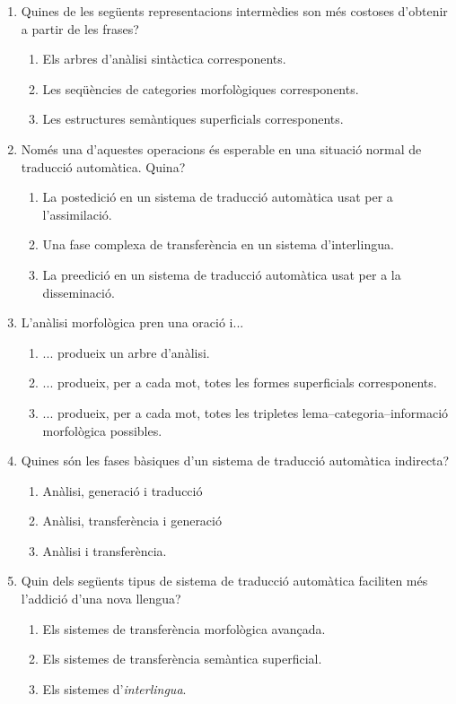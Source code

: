 \begin{enumerate}
\item Quines de les següents representacions intermèdies son més
  costoses d'obtenir a partir de les frases?
  \begin{enumerate}
  \item Els arbres d'anàlisi sintàctica corresponents.
  \item Les seqüències de categories morfològiques corresponents.
  \item Les estructures semàntiques superficials corresponents.
  \end{enumerate}

\item Només una d'aquestes operacions és esperable en una situació
  normal de traducció automàtica. Quina?
  \begin{enumerate}
  \item La postedició en un sistema de traducció automàtica usat per a
    l'assimilació.
  \item Una fase complexa de transferència en un sistema
    d'interlingua.
  \item La preedició en un sistema de traducció automàtica usat per a
    la disseminació.
  \end{enumerate}
      
\item L'anàlisi morfològica pren una oració i...
  \begin{enumerate}
  \item ... produeix un arbre d'anàlisi.
  \item ... produeix, per a cada mot, totes les formes superficials
    corresponents.
  \item ... produeix, per a cada mot, totes les tripletes
    lema--categoria--informació morfològica possibles.
  \end{enumerate}

\item Quines són les fases bàsiques d'un sistema de traducció
  automàtica indirecta?
  \begin{enumerate}
  \item Anàlisi, generació i traducció
  \item Anàlisi, transferència i generació
  \item Anàlisi i transferència.
  \end{enumerate}

\item Quin dels següents tipus de sistema de traducció automàtica
  faciliten més l'addició d'una nova llengua?
  \begin{enumerate}
  \item Els sistemes de transferència morfològica avançada.
  \item Els sistemes de transferència semàntica superficial.
  \item Els sistemes d'\emph{interlingua}.
  \end{enumerate}


\end{enumerate}
